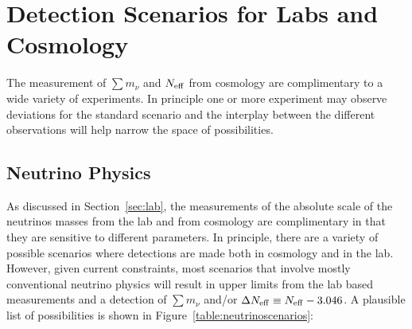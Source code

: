 \section{Detection Scenarios for Labs and Cosmology}

The measurement of $\sum m_\nu$ and $N_{\rm eff}$ from cosmology are complimentary to a wide variety of experiments.  In principle one or more experiment may observe deviations for the standard scenario and the interplay between the different observations will help narrow the space of possibilities. 

\subsection{Neutrino Physics}

As discussed in Section~\ref{sec:lab}, the measurements of the absolute scale of the neutrinos masses from the lab and from cosmology are complimentary in that they are sensitive to different parameters.  In principle, there are a variety of possible scenarios where detections are made both in cosmology and in the lab.  However, given current constraints, most scenarios that involve mostly conventional neutrino physics will result in upper limits from the lab based measurements and a detection of $\sum m_\nu$ and/or $\Delta N_{\rm eff} \equiv N_{\rm eff} - 3.046$.  A plausible list of possibilities is shown in Figure~\ref{table:neutrinoscenarios}:

